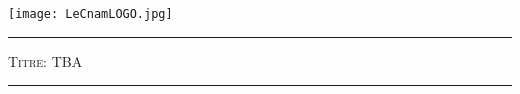 \addtolength{\oddsidemargin}{-5mm}
\addtolength{\textwidth}{3mm}
\addtolength{\topmargin}{-19mm}
\begin{titlepage}
  \enlargethispage{30mm}



\begin{center}
\texttt{[image: LeCnamLOGO.jpg]}

    \vfill

    {\color{darkred} \rule{0.98\textwidth}{0.5mm} }
    \begin{minipage}[c]{.96\textwidth}
      \begin{center}
    \vspace*{8mm}
\Large
    \textsc{
      Titre: TBA
    } 
    \vspace*{8mm}
      \end{center}
    \end{minipage}
    {\color{darkred} \rule{0.98\textwidth}{0.5mm} }



\end{center}
\end{titlepage}
